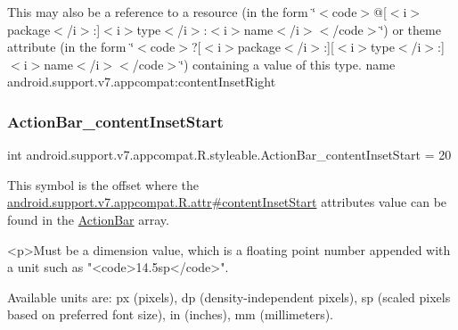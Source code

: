 This may also be a reference to a resource (in the form \char`\"{}$<$code$>$@\mbox{[}$<$i$>$package$<$/i$>$\+:\mbox{]}$<$i$>$type$<$/i$>$\+:$<$i$>$name$<$/i$>$$<$/code$>$\char`\"{}) or theme attribute (in the form \char`\"{}$<$code$>$?\mbox{[}$<$i$>$package$<$/i$>$\+:\mbox{]}\mbox{[}$<$i$>$type$<$/i$>$\+:\mbox{]}$<$i$>$name$<$/i$>$$<$/code$>$\char`\"{}) containing a value of this type.  name android.\+support.\+v7.\+appcompat\+:content\+Inset\+Right \mbox{\label{classandroid_1_1support_1_1v7_1_1appcompat_1_1R_1_1styleable_ac85953ed4627c156cb89dc481a4deaee}} 
\subsubsection{\texorpdfstring{Action\+Bar\+\_\+content\+Inset\+Start}{ActionBar\_contentInsetStart}}
{\footnotesize\ttfamily int android.\+support.\+v7.\+appcompat.\+R.\+styleable.\+Action\+Bar\+\_\+content\+Inset\+Start = 20\hspace{0.3cm}{\ttfamily [static]}}

This symbol is the offset where the \hyperlink{classandroid_1_1support_1_1v7_1_1appcompat_1_1R_1_1attr_a24763fb35393b1e0a6c6b9057f47fc22}{android.\+support.\+v7.\+appcompat.\+R.\+attr\#content\+Inset\+Start} attribute\textquotesingle{}s value can be found in the \hyperlink{classandroid_1_1support_1_1v7_1_1appcompat_1_1R_1_1styleable_a5941dc15714398e9ec9afaa0155cc1cf}{Action\+Bar} array.

\begin{DoxyVerb}      <p>Must be a dimension value, which is a floating point number appended with a unit such as "<code>14.5sp</code>".
\end{DoxyVerb}
 Available units are\+: px (pixels), dp (density-\/independent pixels), sp (scaled pixels based on preferred font size), in (inches), mm (millimeters). 


